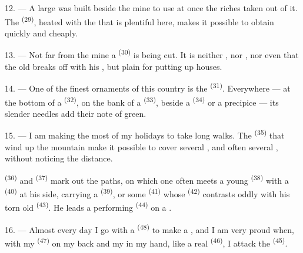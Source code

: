 12. --- A large  was built beside the mine to use at once
the riches taken out of it. The  \textsuperscript{(29)},
heated with the  that is plentiful here, makes it possible to
obtain  quickly and cheaply.

13. --- Not far from the mine a  \textsuperscript{(30)} is being cut.
It is neither , nor , nor even
 that the old  breaks off with his
, but plain  for putting up houses.

14. --- One of the finest ornaments of this country is the 
\textsuperscript{(31)}. Everywhere --- at the bottom of a 
\textsuperscript{(32)}, on the bank of a  \textsuperscript{(33)}, beside a
 \textsuperscript{(34)} or a precipice --- its slender needles add
their note of green.

\VUsaut{3.0mm}
\VUsaut{3.0mm}

15. --- I am making the most of my holidays to take long walks. The
 \textsuperscript{(35)} that wind up the mountain make it possible to
cover several , and often several ,
without noticing the distance.

 \textsuperscript{(36)} and  \textsuperscript{(37)} mark
out the paths, on which one often meets a young 
\textsuperscript{(38)} with a  \textsuperscript{(40)} at his side, carrying
a  \textsuperscript{(39)}, or some  \textsuperscript{(41)} whose
 \textsuperscript{(42)} contrasts oddly with his torn old
 \textsuperscript{(43)}. He leads a performing 
\textsuperscript{(44)} on a .

\VUsaut{3.0mm}

16. --- Almost every day I go with a  \textsuperscript{(48)} to make a
, and I am very proud when, with my 
\textsuperscript{(47)} on my back and my  in my hand, like a real
 \textsuperscript{(46)}, I attack the  \textsuperscript{(45)}.

